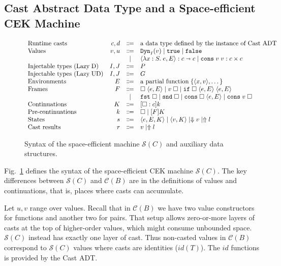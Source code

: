 \documentclass[runningheads]{llncs}
\newcommand{\stxrule}[3]{\text{#2} & #1 & \Coloneqq & #3\\}
\newcommand{\stxrulecont}[1]{& & | & #1 \\}
\newcommand{\figref}[1]{Fig.~\ref{#1}}
\newcommand{\LUD}{\ensuremath{\text{Lazy\;UD}}}
\newcommand{\LD}{\ensuremath{\text{Lazy\;D}}}
\newcommand{\CMachine}[1]{\ensuremath{\mathcal{C}(#1)}}
\newcommand{\SMachine}[1]{\ensuremath{\mathcal{S}(#1)}}
\newcommand{\error}[1]{\ensuremath{\Uparrow#1}}
\newcommand{\Pfunc}[2]{\ensuremath{#1 \shortrightarrow #2}}
\newcommand{\Pprod}[2]{\ensuremath{#1 \times #2}}
\newcommand{\elam}[3]{\lambda#1:#2.\;#3}
\newcommand{\eapp}[2]{#1\;#2}
\newcommand{\eif}[3]{\mathtt{if}\;#1\;#2\;#3}
\newcommand{\econs}[2]{\mathtt{cons} \; #1 \; #2}
\newcommand{\efst}[1]{\mathtt{fst} \; #1}
\newcommand{\esnd}[1]{\mathtt{snd} \; #1}
\newcommand{\ecast}[2]{\ensuremath{#1 : #2}}
\newcommand{\vdyn}[2]{\mathtt{Dyn}_{#1}(#2)}
\newcommand{\vtrue}[0]{\mathtt{true}}
\newcommand{\vfalse}[0]{\mathtt{false}}
\newcommand{\vfunc}[4]{\langle\elam{#1}{#2}{#3},#4\rangle}
\newcommand{\vcons}[2]{\econs{#1}{#2}}
\newcommand{\sexpr}[3]{\ensuremath{\langle#1,#2,#3\rangle}}
\newcommand{\scont}[2]{\ensuremath{\langle#1,#2\rangle}}
\newcommand{\shalt}[1]{\ensuremath{\Downarrow #1}}
\newcommand{\Knil}[0]{\Box}
\newcommand{\Kcons}[2]{[#1]#2}
\newcommand{\closure}[2]{\langle#1,#2\rangle}
\newcommand{\FappXO}[2]{\eapp{\square}{\closure{#1}{#2}}}
\newcommand{\FappOX}[1]{\eapp{#1}{\square}}
\newcommand{\Fif}[3]{\eif{\square}{\closure{#1}{#3}}{\closure{#2}{#3}}}
\newcommand{\FconsXO}[2]{\econs{\square}{\closure{#1}{#2}}}
\newcommand{\FconsOX}[1]{\econs{#1}{\square}}
\newcommand{\Ffst}[0]{\efst{\square}}
\newcommand{\Fsnd}[0]{\esnd{\square}}
\newcommand{\Fcast}[1]{\ecast{\square}{#1}}
\begin{document}
\subsection{Cast Abstract Data Type and a Space-efficient CEK Machine}
\label{sec:cast-adt-and-space-efficient-cek}

\begin{figure}
	\[
	\begin{array}{lrcl}
	\stxrule{c,d}{Runtime casts}{\text{a data type defined by the 
	instance of Cast ADT}}
	\stxrule{v,u}{Values}{
		\vdyn{I}{v}  \mid
		\vtrue       \mid
		\vfalse                     
	}
	\stxrulecont{
		\ecast{\vfunc{x}{S}{e}{E}}{\Pfunc{c}{c}} \mid
		\ecast{\vcons{v}{v}}{\Pprod{c}{c}}
	}
	\stxrule{I,J}{Injectable types (\LD)}{P}
	\stxrule{I,J}{Injectable types (\LUD)}{G}
	\stxrule{E}{Environments}{
		\text{a partial function}\;\{\langle x , v \rangle , \dots \}
	}
	\stxrule{F}{Frames}{
		\FappXO{e}{E}  \mid
		\FappOX{v}     \mid
		\Fif{e}{e}{E}
	}
	\stxrulecont{
		\Ffst \mid
		\Fsnd \mid
		\FconsXO{e}{E}  \mid
		\FconsOX{v}
	}
	\stxrule{K}{Continuations}{
		\Kcons{\Fcast{c}}{k}
	}
	\stxrule{k}{Pre-continuations}{
		\Knil         \mid
		\Kcons{F}{K}
	}
	\stxrule{s}{States}{
		\sexpr{e}{E}{K}  \mid
		\scont{v}{K}     \mid
		\shalt{v}        \mid
		\error{l}
	}
	\stxrule{r}{Cast results}{
		v \mid
		\error{l}
	}
	\end{array}
	\]
	
	\caption{Syntax of the space-efficient machine \SMachine{C} and auxiliary 
	data structures.}
	\label{fig:SEMachine-state}
\end{figure}

\figref{fig:SEMachine-state} defines the syntax of the space-efficient CEK 
machine \SMachine{C}.
The key differences between \SMachine{C} and \CMachine{B} are in the definitions
of values and continuations, that is, places where casts can accumulate.

Let $u,v$ range over values.
%
Recall that in \CMachine{B} we have two value constructors for functions and 
another two for pairs. That setup allows zero-or-more layers of casts at the 
top of higher-order values, which might consume unbounded space. 
%
\SMachine{C} instead has exactly one layer of cast.
Thus non-casted values in \CMachine{B} correspond to \SMachine{C} values
where casts are identities ($\mathit{id}(T)$). The 
$\mathit{id}$ functions is provided by the Cast ADT.
\end{document}
